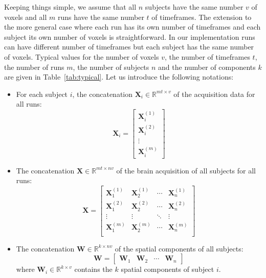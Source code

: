 \documentclass{report}
\begin{document}
Keeping things simple, we assume that all $n$ subjects have the same
number $v$ of voxels and all $m$ runs have the same number $t$ of
timeframes.
%
The extension to the more general case where each run has its own
number of timeframes and each subject its own number of voxels is
straightforward. In our implementation runs can have different number
of timeframes but each subject has the same number of voxels.
%
Typical values for the number of voxels $v$, the number of timeframes
$t$, the number of runs $m$, the number of subjects $n$ and the
number of components $k$ are given in Table~\ref{tab:typical}.
%
Let us introduce the following notations:
\begin{itemize}

\item For each subject $i$, the concatenation $\mathbf{X}_i \in \mathbb{R}^{mt \times v}$ of the acquisition data for all runs:
\begin{equation*}
\mathbf{X}_i = 
\begin{bmatrix}
	\mathbf{X}^{(1)}_i \\
	\mathbf{X}^{(2)}_i \\
	\vdots \\
	\mathbf{X}^{(m)}_i
\end{bmatrix}
\end{equation*}

\item The concatenation $\mathbf{X} \in \mathbb{R}^{mt \times nv}$ of the brain acquisition of all subjects for all runs:
\begin{equation*}
\mathbf{X} = 
\begin{bmatrix}
    \mathbf{X}^{(1)}_1 & \mathbf{X}^{(1)}_2 & \cdots & \mathbf{X}^{(1)}_n \\
    \mathbf{X}^{(2)}_1 & \mathbf{X}^{(2)}_2 & \cdots & \mathbf{X}^{(2)}_n\\
    \vdots & \vdots &\ddots & \vdots\\
    \mathbf{X}^{(m)}_1 & \mathbf{X}^{(m)}_2 & \cdots & \mathbf{X}^{(m)}_n \\
\end{bmatrix}
\end{equation*}

\item The concatenation $\mathbf{W} \in \mathbb{R}^{k \times nv}$ of the spatial components of all subjects:
\begin{equation*}
\mathbf{W} = 
\begin{bmatrix}
    \mathbf{W}_{1} &  \mathbf{W}_{2} & \cdots & \mathbf{W}_{n}
\end{bmatrix}
\end{equation*}
where $\mathbf{W}_{i} \in \mathbb{R}^{k \times v}$ contains the $k$ spatial components of subject $i$.


\end{itemize}
\end{document}
